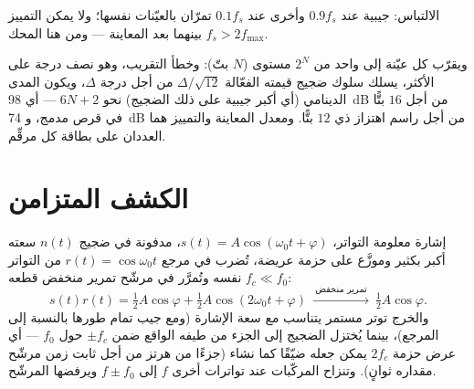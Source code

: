 \begin{omfigure}

{\small الالتباس: جيبية عند $0.9f_s$ وأخرى عند $0.1f_s$ تمرّان
بالعيّنات نفسها؛ ولا يمكن التمييز بينهما بعد المعاينة --- ومن هنا
المحك $f_s > 2f_{\max}$.}
\end{omfigure}

\begin{remark}[التكميم]\label{rem:b2:feedback-oscillators:quantization}
ويقرّب  كل عيّنة إلى واحد من
$2^N$ مستوى ($N$ بتّ): وخطأ التقريب، وهو نصف درجة على الأكثر، يسلك
سلوك ضجيج قيمته الفعّالة $\Delta/\sqrt{12}$ من أجل درجة $\Delta$، ويكون
المدى الدينامي (أي أكبر جيبية على ذلك الضجيج) نحو $6N + 2$  ---
أي \qty{98}{dB} من أجل $16$ بتًّا في قرص مدمج، و \qty{74}{dB} من أجل راسم اهتزاز
ذي $12$ بتًّا. ومعدل المعاينة والتمييز هما العددان على
بطاقة كل مرقِّم.
\end{remark}

\section{الكشف المتزامن}

\begin{proposition}\label{prop:b2:feedback-oscillators:lockin}
إشارة معلومة التواتر، $s(t) = A\cos(\omega_0t + \varphi)$، مدفونة في
ضجيج $n(t)$ سعته أكبر بكثير وموزَّع على حزمة عريضة، تُضرب
في مرجع $r(t) = \cos\omega_0t$ من التواتر نفسه
وتُمرَّر في مرشّح تمرير منخفض قطعه $f_c \ll f_0$:
\[
s(t)r(t) = \tfrac12A\cos\varphi + \tfrac12A\cos(2\omega_0t + \varphi)
\ \xrightarrow{\ \text{تمرير منخفض}\ }\ \tfrac12A\cos\varphi .
\]
والخرج توتر مستمر يتناسب مع سعة الإشارة (ومع
جيب تمام طورها بالنسبة إلى المرجع)، بينما يُختزل الضجيج
إلى الجزء من طيفه الواقع ضمن $\pm f_c$ حول $f_0$
--- أي عرض حزمة $2f_c$ يمكن جعله ضيّقًا كما نشاء (جزءًا
من هرتز من أجل ثابت زمن مرشّح مقداره ثوانٍ). وتنزاح المركّبات عند
تواترات أخرى $f$ إلى $f \pm f_0$ ويرفضها المرشّح.
\end{proposition}

